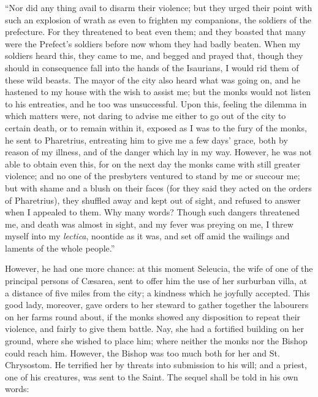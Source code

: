 ``Nor did any thing avail to disarm their violence; but they
urged their point with such an explosion of wrath as even to frighten
my companions, the soldiers of the prefecture. For they threatened to
beat even them; and they boasted that many were the Prefect's soldiers
before now whom they had badly beaten. When my soldiers heard this,
they came to me, and begged and prayed that, though they should in
consequence fall into the hands of the Isaurians, I would rid them of
these wild beasts. The mayor of the city also heard what was going on,
and he hastened to my house with the wish to assist me; but the monks
would not listen to his entreaties, and he too was unsuccessful. Upon
this, feeling the dilemma in which matters
were, not daring to advise me either to go out of the city to certain
death, or to remain within it, exposed as I was to the fury of the
monks, he sent to Pharetrius, entreating him to give me a few days'
grace, both by reason of my illness, and of the danger which lay in my
way. However, he was not able to obtain even this, for on the next day
the monks came with still greater violence; and no one of the
presbyters ventured to stand by me or succour me; but with shame and a
blush on their faces (for they said they acted on the orders of
Pharetrius), they shuffled away and kept out of sight, and refused to
answer when I appealed to them. Why many words? Though such dangers
threatened me, and death was almost in sight, and my fever was preying
on me, I threw myself into my \emph{lectica}, noontide as it was, and
set off amid the wailings and laments of the whole people.''

However, he had one more chance: at this moment Seleucia, the wife
of one of the principal persons of Cæsarea, sent to offer him the use
of her surburban villa, at a distance of five miles from the city; a
kindness which he joyfully accepted. This good lady, moreover, gave
orders to her steward to gather together the labourers on her farms
round about, if the monks showed any disposition to repeat their
violence, and fairly to give them battle. Nay, she had a fortified
building on her ground, where she wished to place him; where neither
the monks nor the Bishop could reach him. However, the Bishop was too
much both for her and St. Chrysostom. He terrified her by threats into
submission to his will; and a priest, one of his creatures, was sent
to the Saint. The sequel shall be told in his own words:

